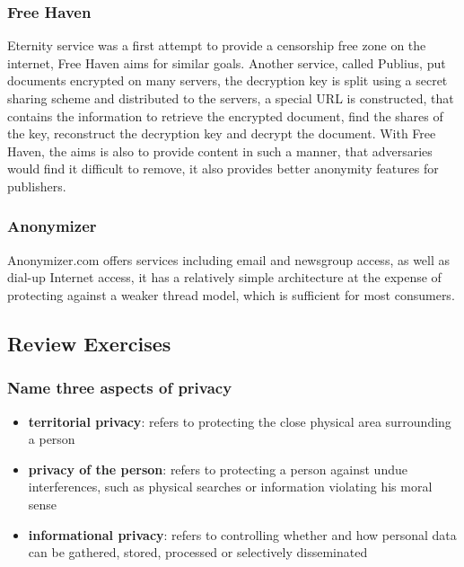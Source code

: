 \documentclass[a4paper, 10 pt, conference]{ieeeconf}
\begin{document}
\vspace{0.5cm}
\subsubsection{\textbf{Free Haven}}
Eternity service was a first attempt to provide a censorship free zone on the internet, Free Haven aims for similar goals.
Another service, called Publius, put documents encrypted on many servers, the decryption key is split using a secret sharing scheme and distributed to the servers, a special URL is constructed, that contains the information to retrieve the encrypted document, find the shares of the key, reconstruct the decryption key and decrypt the document. 
With Free Haven, the aims is also to provide content in such a manner, that adversaries would find it difficult to remove, it also provides better anonymity features for publishers. 


\vspace{0.5cm}
\subsubsection{\textbf{Anonymizer}}
Anonymizer.com offers services including email and newsgroup access, as well as dial-up Internet access, it has a relatively simple architecture at the expense of protecting against a weaker thread model, which is sufficient for most consumers. 




\subsection{\textbf{Review Exercises}}
\subsubsection{\textbf{Name three aspects of privacy}}
\begin{itemize}
\item \textbf{territorial privacy}: refers to protecting the close physical area surrounding a person
\item \textbf{privacy of the person}: refers to protecting a person against undue interferences, such as physical searches or information violating his moral sense
\item \textbf{informational privacy}: refers to controlling whether and how personal data can be gathered, stored, processed or selectively disseminated
\end{itemize}
\end{document}
